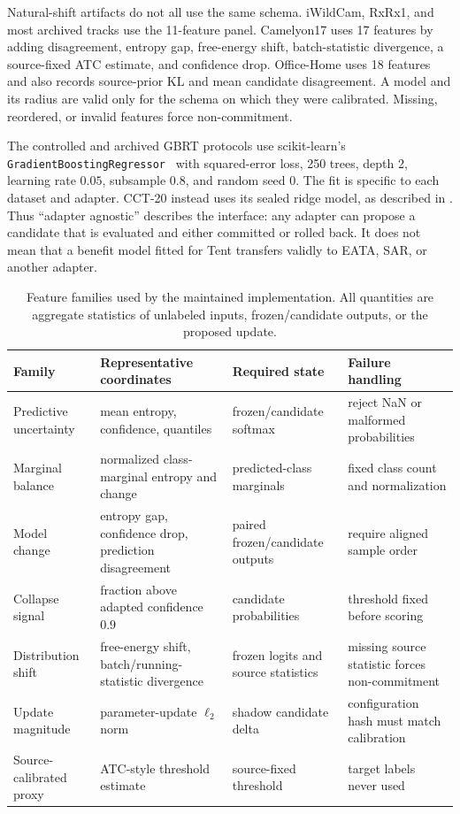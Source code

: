Natural-shift artifacts do not all use the same schema. iWildCam, RxRx1, and most archived tracks
use the 11-feature panel. Camelyon17 uses 17 features by adding disagreement, entropy gap,
free-energy shift, batch-statistic divergence, a source-fixed ATC estimate, and confidence drop.
Office-Home uses 18 features and also records source-prior KL and mean candidate disagreement. A
model and its radius are valid only for the schema on which they were calibrated. Missing,
reordered, or invalid features force non-commitment.

The controlled and archived GBRT protocols use scikit-learn's
\texttt{GradientBoostingRegressor}~\cite{pedregosa2011sklearn} with squared-error loss,
250 trees, depth 2, learning rate $0.05$, subsample $0.8$, and random seed 0. The fit is specific
to each dataset and adapter. CCT-20 instead uses its sealed ridge model, as described in
. Thus ``adapter agnostic'' describes the interface: any adapter can propose a
candidate that is evaluated and either committed or rolled back. It does not mean that a benefit
model fitted for Tent transfers validly to EATA, SAR, or another adapter.



\begin{table}[!t]
\centering
\scriptsize
\caption{Feature families used by the maintained implementation. All quantities are aggregate
statistics of unlabeled inputs, frozen/candidate outputs, or the proposed update.}
\label{tab:compact-evidence}
\begin{tabular}{@{}p{}p{}p{}p{}@{}}
\toprule
Family & Representative coordinates & Required state & Failure handling \\
\midrule
Predictive uncertainty & mean entropy, confidence, quantiles & frozen/candidate softmax & reject NaN or malformed probabilities \\
Marginal balance & normalized class-marginal entropy and change & predicted-class marginals & fixed class count and normalization \\
Model change & entropy gap, confidence drop, prediction disagreement & paired frozen/candidate outputs & require aligned sample order \\
Collapse signal & fraction above adapted confidence $0.9$ & candidate probabilities & threshold fixed before scoring \\
Distribution shift & free-energy shift, batch/running-statistic divergence & frozen logits and source statistics & missing source statistic forces non-commitment \\
Update magnitude & parameter-update $\ell_2$ norm & shadow candidate delta & configuration hash must match calibration \\
Source-calibrated proxy & ATC-style threshold estimate & source-fixed threshold & target labels never used \\
\bottomrule
\end{tabular}
\end{table}


